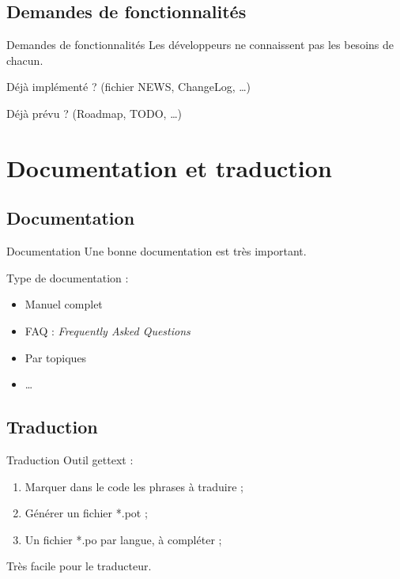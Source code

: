 \documentclass{beamer}
\begin{document}
\subsection{Demandes de fonctionnalités}
\begin{frame}{Demandes de fonctionnalités}
  Les développeurs ne connaissent pas les besoins de chacun.

  \bigskip
  Déjà implémenté ? (fichier NEWS, ChangeLog, …)

  \medskip
  Déjà prévu ? (Roadmap, TODO, …)
\end{frame}

\section{Documentation et traduction}
\begin{frame}
  \tableofcontents[sectionstyle=show/shaded, hideothersubsections]
\end{frame}

\subsection{Documentation}
\begin{frame}{Documentation}
  Une bonne documentation est très important.

  \bigskip
  Type de documentation :
  \begin{itemize}
    \item Manuel complet
    \item FAQ : \textit{Frequently Asked Questions}
    \item Par topiques
    \item …
  \end{itemize}
\end{frame}

\subsection{Traduction}
\begin{frame}{Traduction}
  Outil gettext :
  \begin{enumerate}
    \item Marquer dans le code les phrases à traduire ;
    \item Générer un fichier *.pot ;
    \item Un fichier *.po par langue, à compléter ;
  \end{enumerate}

  \bigskip
  Très facile pour le traducteur.
\end{frame}
\end{document}
